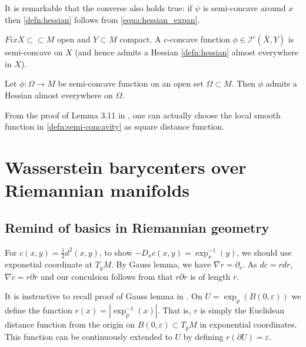 It is remarkable that the converse also holds true: if \( \psi \) is semi-concave around \( x \) then \cref{defn:hessian} follows from \cref{equa:hessian_expan}.

\begin{prop}
	\( F i x X \subset \subset M \) open and \( Y \subset M \) compact. A \( c \)-concave function \( \phi \in \mathcal{I} ^ { c } ( \bar { X } , Y ) \) is semi-concave on \( X \) (and hence admits a Hessian \cref{defn:hessian} almost everywhere in \( X \)).
\end{prop}

\begin{thm}
	Let \( \phi : \Omega \rightarrow M \) be semi-concave function on an open set \( \Omega \subset M . \) Then \( \phi \) admits a Hessian almost everywhere on \( \Omega \).
\end{thm}

From the proof of Lemma 3.11 in \cite[]{cordero2001riemannian}, one can actually choose the local smooth function in \cref{defn:semi-concavity} as square distance function.

\section{Wasserstein barycenters over Riemannian manifolds}

\subsection{Remind of basics in Riemannian geometry}

For \( c ( x , y ) = \frac{ 1 } { 2 } d ^ { 2 } ( x , y ) \), to show \( - D _ { x } c ( x , y ) = \exp _ { x } ^ { - 1 } ( y ) \), we should use exponetial coordinate at $T_yM$.
By Gauss lemma, we have \( \nabla r = \partial _ { r } \).
As $d c = r dr$, $\nabla c = r \partial r$ and our conculsion follows from that $ r \partial r $ is of length $r$.

It is instructive to recall proof of Gauss lemma in \cite{Petersen2016}.
On \( U = \exp _ { p } ( B ( 0 , \varepsilon ) ) \) we define the function \( r ( x ) = \left| \exp _ { p } ^ { - 1 } ( x ) \right| . \)
That is, \( r \) is simply the Euclidean distance function from the origin on \( B ( 0 , \varepsilon ) \subset T _ { p } M \) in exponential coordinates.
This function can be continuously extended to \( U \) by defining \( r ( \partial U ) = \varepsilon . \)

